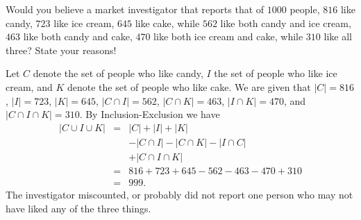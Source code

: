 \begin{exer}
Would you believe a market investigator that reports that of $1000$
people, $816$ like candy, $723$ like ice cream, $645$ like cake, while
$562$ like both candy and ice cream, $463$ like both candy and cake,
$470$ like both ice cream and cake, while $310$ like all three? State
your reasons! 
\vspace*{3in}
\begin{answer} 
Let $C$ denote the set of people
who like candy, $I$ the set of people who like ice cream, and $K$
denote the set of people who like cake. We are given that $|C|
= 816$, $|I| = 723$, $|K| = 645$, $|C\cap I| = 562$,
$|C\cap K| = 463$, $|I\cap K| = 470$, and $|C\cap I\cap K| = 310$. By Inclusion-Exclusion we have
$$\begin{array}{lll}
|C \cup I \cup K| & = & |C| + |I| + |K| \\ & & -
|C \cap I| - |C \cap K |
- |I \cap C| \\ & &  + |C \cap I \cap K| \\
& = & 816 + 723 + 645 - 562 - 463 - 470 + 310 \\ & = & 999.
\end{array}$$
The investigator miscounted, or probably did not report one person
who may not have liked any of the three things.
\end{answer}
\end{exer}


